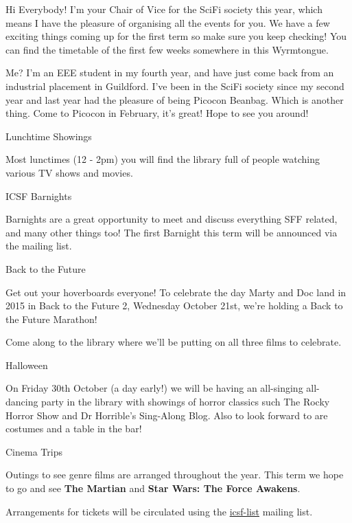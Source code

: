 \vspace{1mm} 

Hi Everybody! I’m your Chair of Vice for the SciFi society this year, which means I have the pleasure of organising all the events for you. We have a few exciting things coming up for the first term so make sure you keep checking! You can find the timetable of the first few weeks somewhere in this Wyrmtongue.

Me? I’m an EEE student in my fourth year, and have just come back from an industrial placement in Guildford. I’ve been in the SciFi society since my second year and last year had the pleasure of being Picocon Beanbag. Which is another thing. Come to Picocon in February, it’s great! Hope to see you around!

\vspace{1mm} {\Large Lunchtime Showings}

Most lunctimes (12 - 2pm) you will find the library full of people watching various TV shows and movies. 

\vspace{1mm} {\Large ICSF Barnights}

Barnights are a great opportunity to meet and discuss everything SFF related, and many other things too! The first Barnight this term will be announced via the mailing list.

\vspace{1mm} {\Large Back to the Future}

Get out your hoverboards everyone! To celebrate the day Marty and Doc land in 2015 in Back to the Future 2, Wednesday October 21st, we're holding a Back to the Future Marathon!

Come along to the library where we'll be putting on all three films to celebrate. 

\vspace{1mm} {\Large Halloween}

On Friday 30th October (a day early!) we will be having an all-singing all-dancing party in the library with showings of horror classics such The Rocky Horror Show and Dr Horrible's Sing-Along Blog. Also to look forward to are costumes and a table in the bar!

\vspace{1mm} {\Large Cinema Trips}

Outings to see genre films are arranged throughout the year. This term we hope to go and see \textbf{The Martian} and \textbf{Star Wars: The Force Awakens}.

Arrangements for tickets will be circulated using the \url{icsf-list} mailing list.
